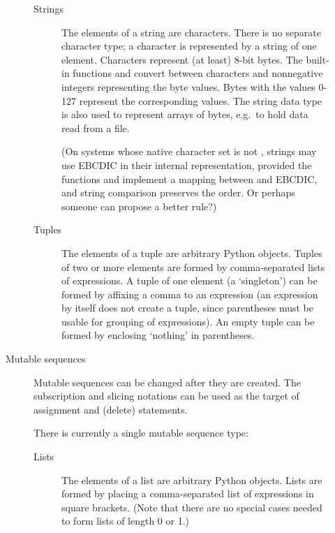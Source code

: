 \begin{description}
\begin{description}
\begin{description}
\item[Strings]
The elements of a string are characters.  There is no separate
character type; a character is represented by a string of one element.
Characters represent (at least) 8-bit bytes.  The built-in
functions  and
 convert between characters and
nonnegative integers representing the byte values.  Bytes with the
values 0-127 represent the corresponding \ASCII{} values.  The string
data type is also used to represent arrays of bytes, e.g.\ to hold data
read from a file.

(On systems whose native character set is not \ASCII{}, strings may use
EBCDIC in their internal representation, provided the functions
 and  implement a mapping between \ASCII{} and
EBCDIC, and string comparison preserves the \ASCII{} order.
Or perhaps someone can propose a better rule?)

\item[Tuples]
The elements of a tuple are arbitrary Python objects.
Tuples of two or more elements are formed by comma-separated lists
of expressions.  A tuple of one element (a `singleton') can be formed
by affixing a comma to an expression (an expression by itself does
not create a tuple, since parentheses must be usable for grouping of
expressions).  An empty tuple can be formed by enclosing `nothing' in
parentheses.

\end{description} %

\item[Mutable sequences]
Mutable sequences can be changed after they are created.  The
subscription and slicing notations can be used as the target of
assignment and  (delete) statements.

There is currently a single mutable sequence type:

\begin{description}

\item[Lists]
The elements of a list are arbitrary Python objects.  Lists are formed
by placing a comma-separated list of expressions in square brackets.
(Note that there are no special cases needed to form lists of length 0
or 1.)


\end{description}
\end{description}
\end{description}
